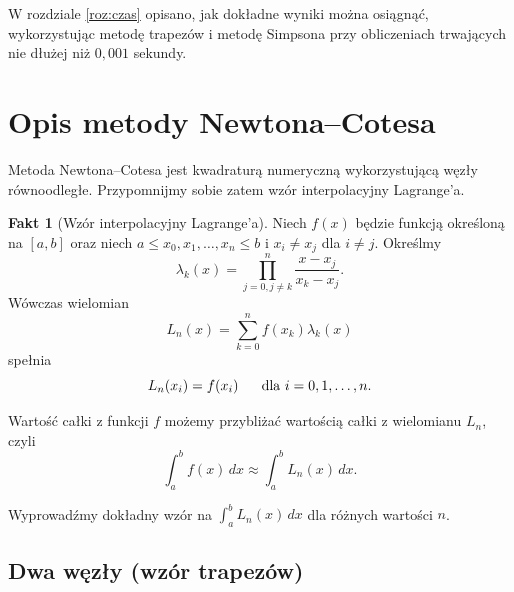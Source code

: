 \documentclass{article}
\theoremstyle{definition}
\newtheorem{fa}[tw]{Fakt}
\begin{document}
\medskip

\noindent W rozdziale \ref{roz:czas} opisano, jak dokładne wyniki można osiągnąć, wykorzystując metodę trapezów i metodę Simpsona przy obliczeniach trwających nie dłużej niż \(0,001\) sekundy.

\newpage


\section{Opis metody Newtona--Cotesa}

Metoda Newtona--Cotesa jest kwadraturą numeryczną wykorzystującą węzły równoodległe. Przypomnijmy sobie zatem wzór interpolacyjny Lagrange'a. 

\begin{fa}[Wzór interpolacyjny Lagrange'a]
    \label{wzor_interpolacyjny_Largange}
    Niech \(f(x)\) będzie funkcją określoną na \([a,b]\) oraz niech \(a \leq x_0, x_1, \ldots, x_n \leq b\) i \(x_i \neq x_j\) dla \(i \neq j\). Określmy
    \[
        \lambda_k(x) = \prod_{j=0, j \neq k}^{n} \frac{x-x_j}{x_k - x_j} \text{.}
    \]
    Wówczas wielomian
    \[
        L_n(x) = \sum_{k=0}^{n} f(x_k)\lambda_k(x)
    \]
    spełnia 
    \[
        L_n(x_i) = f(x_i) \text{ \hspace{10pt} dla \(i = 0, 1, \ldots, n\).}
    \]
\end{fa}



\noindent Wartość całki z funkcji \(f\) możemy przybliżać wartością całki z wielomianu \(L_n\), czyli
\[
    \int_a^b f(x) \,dx \approx \int_a^b L_n(x) \,dx \text{.}
\]

\noindent Wyprowadźmy dokładny wzór na \(\int_a^b L_n(x) \,dx \) dla różnych wartości \(n\).

\subsection{Dwa węzły (wzór trapezów)}
\end{document}

